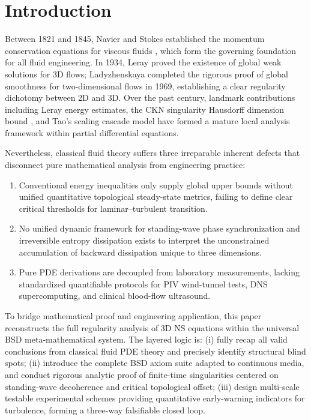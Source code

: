 \documentclass[11pt,a4paper]{article}
\theoremstyle{remark}
\begin{document}
\section{Introduction}\label{sec:intro}

Between 1821 and 1845, Navier and Stokes established the momentum conservation equations for viscous fluids \citep{Navier1821,Stokes1845}, which form the governing foundation for all fluid engineering. In 1934, Leray \citep{Leray1934} proved the existence of global weak solutions for 3D flows; Ladyzhenskaya \citep{Ladyzhenskaya1969} completed the rigorous proof of global smoothness for two-dimensional flows in 1969, establishing a clear regularity dichotomy between 2D and 3D. Over the past century, landmark contributions including Leray energy estimates, the CKN singularity Hausdorff dimension bound \citep{CKN1982}, and Tao's scaling cascade model \citep{Tao2016} have formed a mature local analysis framework within partial differential equations.

Nevertheless, classical fluid theory suffers three irreparable inherent defects that disconnect pure mathematical analysis from engineering practice:
\begin{enumerate}
    \item Conventional energy inequalities only supply global upper bounds without unified quantitative topological steady-state metrics, failing to define clear critical thresholds for laminar--turbulent transition.
    \item No unified dynamic framework for standing-wave phase synchronization and irreversible entropy dissipation exists to interpret the unconstrained accumulation of backward dissipation unique to three dimensions.
    \item Pure PDE derivations are decoupled from laboratory measurements, lacking standardized quantifiable protocols for PIV wind-tunnel tests, DNS supercomputing, and clinical blood-flow ultrasound.
\end{enumerate}

To bridge mathematical proof and engineering application, this paper reconstructs the full regularity analysis of 3D NS equations within the universal BSD meta-mathematical system. The layered logic is: (i) fully recap all valid conclusions from classical fluid PDE theory and precisely identify structural blind spots; (ii) introduce the complete BSD axiom suite adapted to continuous media, and conduct rigorous analytic proof of finite-time singularities centered on standing-wave decoherence and critical topological offset; (iii) design multi-scale testable experimental schemes providing quantitative early-warning indicators for turbulence, forming a three-way falsifiable closed loop.
\end{document}
